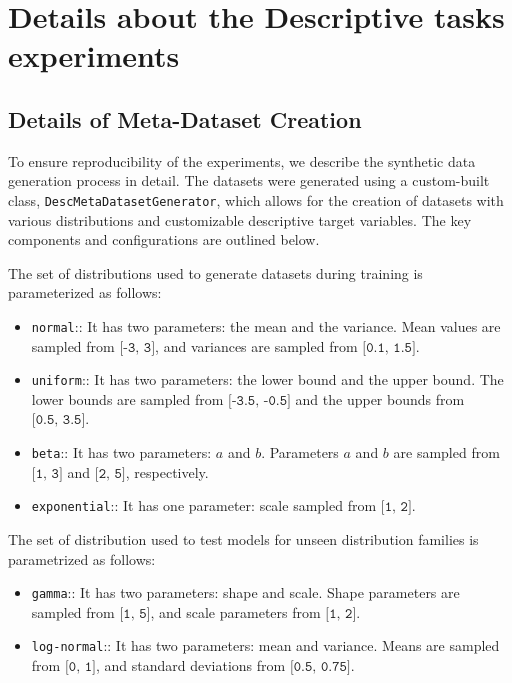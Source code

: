 \section{Details about the Descriptive tasks experiments}
\label{app:desc_details}

\subsection{Details of Meta-Dataset Creation}
\label{app:data_generation}

To ensure reproducibility of the experiments, we describe the synthetic data generation process in detail. The datasets were generated using a custom-built class, \texttt{DescMetaDatasetGenerator}, which allows for the creation of datasets with various distributions and customizable descriptive target variables. The key components and configurations are outlined below.

The set of distributions used to generate datasets during training is parameterized as follows:
\begin{itemize}
    \item \texttt{normal}:: It has two parameters: the mean and the variance. Mean values are sampled from $\texttt{[-3, 3]}$, and variances are sampled from $\texttt{[0.1, 1.5]}$. 
    \item \texttt{uniform}:: It has two parameters: the lower bound and the upper bound. The lower bounds are sampled from $\texttt{[-3.5, -0.5]}$ and the upper bounds from $\texttt{[0.5, 3.5]}$.
    \item \texttt{beta}:: It has two parameters: $a$ and $b$. Parameters $a$ and $b$ are sampled from $\texttt{[1, 3]}$ and $\texttt{[2, 5]}$, respectively.
    \item \texttt{exponential}:: It has one parameter: scale sampled from $\texttt{[1, 2]}$.
\end{itemize}

The set of distribution used to test models for unseen distribution families is parametrized as follows:
\begin{itemize}
    \item \texttt{gamma}:: It has two parameters: shape and scale. Shape parameters are sampled from $\texttt{[1, 5]}$, and scale parameters from $\texttt{[1, 2]}$.
    \item \texttt{log-normal}:: It has two parameters: mean and variance. Means are sampled from $\texttt{[0, 1]}$, and standard deviations from $\texttt{[0.5, 0.75]}$.
\end{itemize}

